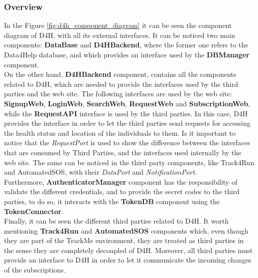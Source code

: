 \documentclass[a4paper, hidelinks, 12pt]{report}
\begin{document}
			\subsubsection{Overview}
		In the Figure \ref{fig:d4h_component_diagram} it can be seen the component diagram of D4H, with all its external interfaces. It can be noticed two main components: \textbf{DataBase} and \textbf{D4HBackend}, where the former one refers to the Data4Help database, and which provides an interface used by the \textbf{DBManager} component. \\
		
		On the other hand, \textbf{D4HBackend} component, contains all the components related to D4H, which are needed to provide the interfaces used by the third parties and the web site. The following interfaces are used by the web site: \textbf{SignupWeb}, \textbf{LoginWeb}, \textbf{SearchWeb}, \textbf{RequestWeb} and  \textbf{SubscriptionWeb}, while the \textbf{RequestAPI} interface is used by the third parties. In this case, D4H provides the interface in order to let the third parties send requests for accessing the health status and location of the individuals to them. Is it important to notice that the \textit{RequestPort} is used to show the difference between the interfaces that are consumed by Third Parties, and the interfaces used internally by the web site. The same can be noticed in the third party components, like Track4Run and AutomatedSOS, with their \textit{DataPort} and \textit{NotificationPort}.\\
		
		Furthermore, \textbf{AuthenticatorManager} component has the responsibility of validate the different credentials, and to provide the secret codes to the third parties, to do so, it interacts with the \textbf{TokenDB} component using the \textbf{TokenConnector}.\\
		
		Finally, it can be seen the different third parties related to D4H. It worth mentioning \textbf{Track4Run} and \textbf{AutomatedSOS} components which, even though they are part of the TrackMe environment, they are treated as third parties in the sense they are completely decoupled of D4H. Moreover, all third parties must provide an interface to D4H in order to let it communicate the incoming changes of the subscriptions.\\
	
\end{document}
